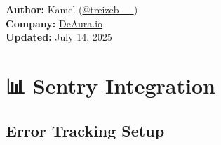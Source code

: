 \documentclass[11pt,a4paper]{article}
\begin{document}
\begin{titlepage}
    \vfill
    
    {\large\textbf{Author:} Kamel (\href{https://x.com/treizeb__}{@treizeb\_\_})\\
    \textbf{Company:} \href{https://deaura.io}{DeAura.io}\\
    \textbf{Updated:} July 14, 2025\par}
\end{titlepage}

\newpage
\tableofcontents
\newpage

\section{📊 Sentry Integration}

\subsection{Error Tracking Setup}
\end{document}
